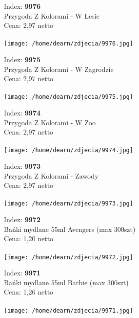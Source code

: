 {Index: \textbf{9976}\\
Przygoda Z Kolorami - W Lesie\\
Cena: 2,97 netto   \\\\  \texttt{[image: /home/dearn/zdjecia/9976.jpg]}}\newline\newline

{Index: \textbf{9975}\\
Przygoda Z Kolorami - W Zagrodzie \\
Cena: 2,97 netto   \\\\  \texttt{[image: /home/dearn/zdjecia/9975.jpg]}}\newline\newline

{Index: \textbf{9974}\\
Przygoda Z Kolorami - W Zoo \\
Cena: 2,97 netto   \\\\  \texttt{[image: /home/dearn/zdjecia/9974.jpg]}}\newline\newline

{Index: \textbf{9973}\\
Przygoda Z Kolorami - Zawody \\
Cena: 2,97 netto   \\\\  \texttt{[image: /home/dearn/zdjecia/9973.jpg]}}\newline\newline

{Index: \textbf{9972}\\
Bańki mydlane 55ml Avengers (max 300szt)\\
Cena: 1,20 netto   \\\\  \texttt{[image: /home/dearn/zdjecia/9972.jpg]}}\newline\newline

{Index: \textbf{9971}\\
Bańki mydlane 55ml Barbie (max 300szt)\\
Cena: 1,26 netto   \\\\  \texttt{[image: /home/dearn/zdjecia/9971.jpg]}}\newline\newline

